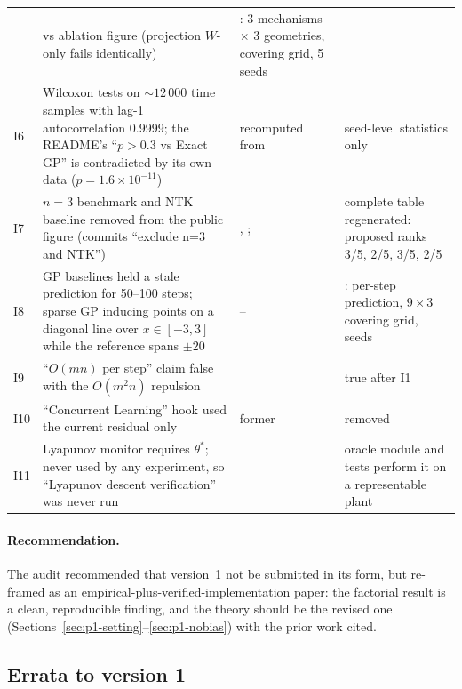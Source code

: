 \begin{table}[tp]
\begin{tabularx}{\textwidth}{@{}l>{\hsize}Y>{\hsize}Y>{\hsize}Y@{}}
&  vs ablation figure (projection $W$-only fails identically)
& : 3 mechanisms $\times$ 3 geometries, covering grid, 5 seeds\\
\addlinespace[1.5pt]
I6 & Wilcoxon tests on ${\sim}12\,000$ time samples with lag-1 autocorrelation 0.9999; the README's ``$p > 0.3$ vs
Exact GP'' is contradicted by its own data ($p = 1.6\times 10^{-11}$)
& recomputed from 
& seed-level statistics only\\
\addlinespace[1.5pt]
I7 & $n = 3$ benchmark and NTK baseline removed from the public figure (commits ``exclude n=3 and NTK'')
& , ; 
& complete table regenerated: proposed ranks 3/5, 2/5, 3/5, 2/5\\
\addlinespace[1.5pt]
I8 & GP baselines held a stale prediction for 50--100 steps; sparse GP inducing points on a diagonal line over
$x \in [-3,3]$ while the reference spans $\pm 20$
& --
& : per-step prediction, $9\times 3$ covering grid, seeds\\
\addlinespace[1.5pt]
I9 & ``$O(mn)$ per step'' claim false with the $O(m^2n)$ repulsion
& 
& true after I1\\
\addlinespace[1.5pt]
I10 & ``Concurrent Learning'' hook used the current residual only
& former 
& removed\\
\addlinespace[1.5pt]
I11 & Lyapunov monitor requires $\theta^*$; never used by any experiment, so ``Lyapunov descent verification'' was
never run
& 
& oracle module and tests perform it on a representable plant\\
\bottomrule
\end{tabularx}
\end{table}

\paragraph{Recommendation.} The audit recommended that version~1 not be submitted in its form, but re-framed as an
empirical-plus-verified-implementation paper: the factorial result is a clean, reproducible finding, and the theory
should be the revised one (Sections~\ref{sec:p1-setting}--\ref{sec:p1-nobias}) with the prior work cited.

\subsection{Errata to version 1}

